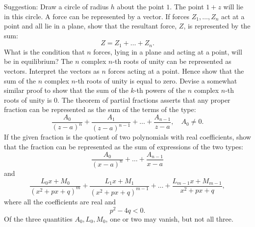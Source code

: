 	Suggestion: Draw a circle of radius $h$ about the point $1$. The point $1+z$ will lie in this circle.
\problem A force can be represented by a vector. If forces $Z_1, \dots , Z_n$ act at a point and all lie in a plane, show that the resultant force, $Z$, is represented by the sum:
	\[
	Z=Z_1+\dots +Z_n
	.\] 
\problem What is the condition that $n$ forces, lying in a plane and acting at a point, will be in equilibrium? 
\problem The $n$ complex $n$-th roots of unity can be represented as vectors. Interpret the vectors as $n$ forces acting at a point. Hence show that the sum of the $n$ complex $n$-th roots of unity is equal to zero. 
\problem Devise a somewhat similar proof to show that the sum of the $k$-th powers of the $n$ complex $n$-th roots of unity is $0$.
\problem The theorem of partial fractions asserts that any proper fraction can be represented as the sum of the terms of the type:
	 \[
		 \frac{A_0}{(z-a)^n} +\frac{A_1}{(z-a)^{n-1}}+\dots +\frac{A_{n-1} }{z-a} , \quad A_0\neq 0
	.\] If the given fraction is the quotient of two polynomials with real coefficients, show that the fraction can be represented as the sum of expressions of the two types:
	\[
		\frac{A_0}{(x-a)^n}+\dots +\frac{A_{n-1} }{x-a} 
	\] and
	\[
		\frac{L_0x+M_0}{(x^2+px+q)^m} +\frac{L_1x+M_1}{(x^2+px+q)^{m-1}} +\dots +\frac{L_{m-1} x+M_{m-1} }{x^2+px+q} 
	,\] where all the coefficients are real and
	\[
	p^2-4q<0
	.\] Of the three quantities $A_0, L_0, M_0$, one or two may vanish, but not all three.
%

